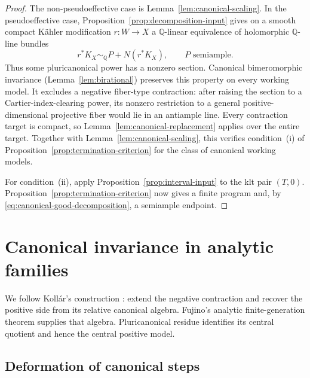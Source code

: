 \documentclass[11pt,a4paper]{article}
\numberwithin{equation}{section}
\theoremstyle{definition}
\theoremstyle{remark}
\newcommand{\Q}{\mathbb Q}\newcommand{\R}{\mathbb R}
\begin{document}
\begin{proof}
The non-pseudoeffective case is Lemma~\ref{lem:canonical-scaling}.
In the pseudoeffective case, Proposition~\ref{prop:decomposition-input}
gives on a smooth compact Kähler modification $r:W\to X$ a
$\Q$-linear equivalence of holomorphic $\Q$-line bundles
\begin{equation}\label{eq:canonical-good-decomposition}
 r^*K_X\sim_{\Q}P+N(r^*K_X),\qquad P\text{ semiample}.
\end{equation}
Thus some pluricanonical power has a nonzero section. Canonical
bimeromorphic invariance (Lemma~\ref{lem:birational}) preserves
this property on every working model. It excludes a negative
fiber-type contraction: after raising the section to a
Cartier-index-clearing power, its nonzero restriction to a general
positive-dimensional projective fiber would lie in an antiample line.
Every contraction target is compact, so
Lemma~\ref{lem:canonical-replacement} applies over the entire target.
Together with Lemma~\ref{lem:canonical-scaling}, this verifies condition~\textup{(i)} of
Proposition~\ref{prop:termination-criterion} for the class of
canonical working models.

For condition~\textup{(ii)}, apply
Proposition~\ref{prop:interval-input} to the klt pair $(T,0)$.
Proposition~\ref{prop:termination-criterion} now gives a finite
program and, by \eqref{eq:canonical-good-decomposition}, a
semiample endpoint.
\end{proof}

\section{Canonical invariance in analytic families}
\label{sec:kollar-family}

We follow Kollár's construction \cite[paragraph~8]{Kollar2021}:
extend the negative contraction and recover the positive side from
its relative canonical algebra. Fujino's analytic finite-generation
theorem \cite[Theorem~1.18]{Fujino2022} supplies that algebra.
Pluricanonical residue identifies its central quotient and hence
the central positive model.

\subsection{Deformation of canonical steps}
\end{document}
